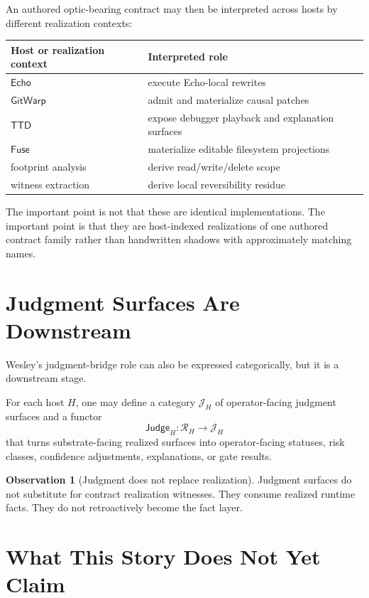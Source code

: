 \documentclass[11pt]{article}
\newcommand{\RHost}[1]{\mathcal{R}_{#1}}
\newcommand{\Judge}{\mathsf{Judge}}
\newcommand{\TTD}{\ensuremath{\mathsf{TTD}}}
\newcommand{\Echo}{\ensuremath{\mathsf{Echo}}}
\newcommand{\GitWarp}{\ensuremath{\mathsf{GitWarp}}}
\newcommand{\Fuse}{\ensuremath{\mathsf{Fuse}}}
\theoremstyle{definition}
\newtheorem{observation}{Observation}
\begin{document}
An authored optic-bearing contract may then be interpreted across hosts by
different realization contexts:
\begin{center}
\begin{tabular}{@{}ll@{}}
\toprule
Host or realization context & Interpreted role \\
\midrule
\Echo{} & execute Echo-local rewrites \\
\GitWarp{} & admit and materialize causal patches \\
\TTD{} & expose debugger playback and explanation surfaces \\
\Fuse{} & materialize editable filesystem projections \\
footprint analysis & derive read/write/delete scope \\
witness extraction & derive local reversibility residue \\
\bottomrule
\end{tabular}
\end{center}

The important point is not that these are identical implementations. The
important point is that they are host-indexed realizations of one authored
contract family rather than handwritten shadows with approximately matching
names.

\section{Judgment Surfaces Are Downstream}

Wesley's judgment-bridge role can also be expressed categorically, but it is a
downstream stage.

For each host $H$, one may define a category $\mathcal{J}_H$ of
operator-facing judgment surfaces and a functor
\[
\Judge_H : \RHost{H} \to \mathcal{J}_H
\]
that turns substrate-facing realized surfaces into operator-facing statuses,
risk classes, confidence adjustments, explanations, or gate results.

\begin{observation}[Judgment does not replace realization]
Judgment surfaces do not substitute for contract realization witnesses. They
consume realized runtime facts. They do not retroactively become the fact
layer.
\end{observation}

\section{What This Story Does Not Yet Claim}
\end{document}
